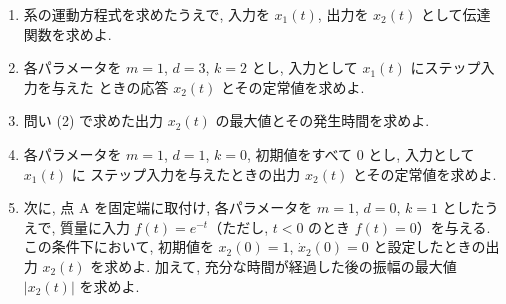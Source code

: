 \begin{enumerate}[label=(\arabic*)]
  \item 系の運動方程式を求めたうえで, 入力を $x_1(t)$, 出力を $x_2(t)$ として伝達関数を求めよ.

  \item 各パラメータを $m=1$, $d=3$, $k=2$ とし, 入力として $x_1(t)$ にステップ入力を与えた
        ときの応答 $x_2(t)$ とその定常値を求めよ.

  \item 問い (2) で求めた出力 $x_2(t)$ の最大値とその発生時間を求めよ.

  \item 各パラメータを $m=1$, $d=1$, $k=0$, 初期値をすべて $0$ とし, 入力として $x_1(t)$ に
        ステップ入力を与えたときの出力 $x_2(t)$ とその定常値を求めよ.

  \item 次に, 点 A を固定端に取付け, 各パラメータを $m=1$, $d=0$, $k=1$ としたうえで,
        質量に入力 $f(t)=e^{-t}$（ただし, $t<0$ のとき $f(t)=0$）を与える.
        この条件下において, 初期値を $x_2(0)=1$, $\dot{x}_2(0)=0$ と設定したときの出力
        $x_2(t)$ を求めよ. 加えて, 充分な時間が経過した後の振幅の最大値 $|x_2(t)|$ を求めよ.
\end{enumerate}
